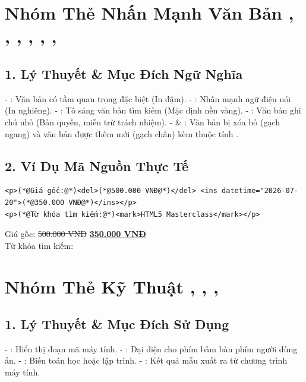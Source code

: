 \section{Nhóm Thẻ Nhấn Mạnh Văn Bản , , , , , , }
\subsection{1. Lý Thuyết \& Mục Đích Ngữ Nghĩa}
- : Văn bản có tầm quan trọng đặc biệt (In đậm).
- : Nhấn mạnh ngữ điệu nói (In nghiêng).
- : Tô sáng văn bản tìm kiếm (Mặc định nền vàng).
- : Văn bản ghi chú nhỏ (Bản quyền, miễn trừ trách nhiệm).
-  \& : Văn bản bị xóa bỏ (gạch ngang) và văn bản được thêm mới (gạch chân) kèm thuộc tính .

\subsection{2. Ví Dụ Mã Nguồn Thực Tế}
\begin{codeWindow}
\begin{lstlisting}[language=HTML5]
<p>(*@Giá gốc:@*)<del>(*@500.000 VNĐ@*)</del> <ins datetime="2026-07-20">(*@350.000 VNĐ@*)</ins></p>
<p>(*@Từ khóa tìm kiếm:@*)<mark>HTML5 Masterclass</mark></p>
\end{lstlisting}
\end{codeWindow}

\begin{browserWindow}
\sffamily\small
Giá gốc: \sout{\color{gray!80}500.000 VNĐ} \;\; \underline{\color{primaryBlue}\bfseries 350.000 VNĐ}\\[4pt]
Từ khóa tìm kiếm: 
\end{browserWindow}

\section{Nhóm Thẻ Kỹ Thuật , , , }
\subsection{1. Lý Thuyết \& Mục Đích Sử Dụng}
- : Hiển thị đoạn mã máy tính.
- : Đại diện cho phím bấm bàn phím người dùng ấn.
- : Biến toán học hoặc lập trình.
- : Kết quả mẫu xuất ra từ chương trình máy tính.

